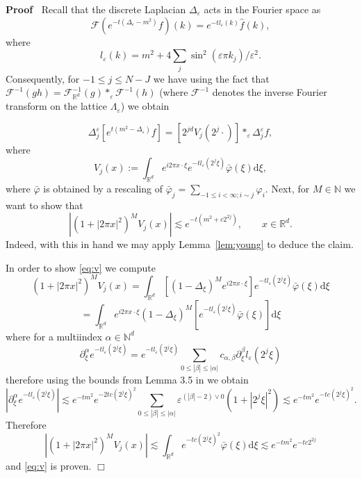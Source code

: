 \documentclass[a4paper,11pt]{article}
\newcommand{\assign}{:=}
\newcommand{\cdummy}{\cdot}
\newcommand{\mathd}{\mathrm{d}}
\newenvironment{proof}{\noindent\textbf{Proof\ }}{\hspace*{\fill}$\Box$\medskip}
\numberwithin{equation}{section}
\begin{document}
\begin{proof}
  Recall that the discrete Laplacian $\Delta_{\varepsilon}$ acts in the
  Fourier space as
  \[ \mathcal{F} (e^{- t (\Delta_{\varepsilon} - m^2)} f) (k) = e^{- t
     l_{\varepsilon} (k)} \hat{f} (k), \]
  where
  \[ l_{\varepsilon} (k) = m^2 + 4 \sum_{j}\sin^2 (\varepsilon \pi k_{j}) /
     \varepsilon^2 . \]
  Consequently, for $- 1 \leqslant j \leqslant N - J$ we have using the fact
  that $\mathcal{F}^{- 1} (g h) =\mathcal{F}_{\mathbb{R}^d}^{- 1} (g)
  \ast_{\varepsilon} \mathcal{F}^{- 1} (h)$ (where $\mathcal{F}^{- 1}$ denotes
  the inverse Fourier transform on the lattice $\Lambda_{\varepsilon}$) we
  obtain
  
  
  \[ \Delta^{\varepsilon}_j [e^{t (m^2 - \Delta_{\varepsilon})} f] = [2^{j d}
     V_j (2^j \cdummy)] \ast_{\varepsilon} \Delta^{\varepsilon}_j f, \]
  where
  \[ V_j (x) \assign \int_{\mathbb{R}^d} e^{i 2 \pi x \cdummy \xi} e^{- t
     l_{\varepsilon} (2^j \xi)} \bar{\varphi} (\xi) \mathd \xi, \]
  where $\bar{\varphi}$ is obtained by a rescaling of $\bar{\varphi}_j =
  \sum_{- 1 \leqslant i < \infty ; i \sim j} \varphi_i$. Next, for $M \in
  \mathbb{N}$ we want to show that
  \begin{equation}
    | (1 + | 2 \pi x |^2)^M V_j (x) | \lesssim e^{- t (m^2 + c 2^{2 j})},
    \qquad x \in \mathbb{R}^d . \label{eq:v}
  \end{equation}
  Indeed, with this in hand we may apply Lemma~\ref{lem:young} to deduce the
  claim.
  
  In order to show {\eqref{eq:v}} we compute
  \[ (1 + | 2 \pi x |^2)^M V_j (x) = \int_{\mathbb{R}^d} [(1 - \Delta_{\xi})^M
     e^{i 2 \pi x \cdummy \xi}] e^{- t l_{\varepsilon} (2^j \xi)}
     \bar{\varphi} (\xi) \mathd \xi \]
  \[ = \int_{\mathbb{R}^d} e^{i 2 \pi x \cdummy \xi} (1 - \Delta_{\xi})^M
     [e^{- t l_{\varepsilon} (2^j \xi)} \bar{\varphi} (\xi)] \mathd \xi \]
  where for a multiindex $\alpha \in \mathbb{N}^d$
  \[ \partial_{\xi}^{\alpha} e^{- t l_{\varepsilon} (2^j \xi)} = e^{- t
     l_{\varepsilon} (2^j \xi)} \sum_{0 \leqslant | \beta | \leqslant | \alpha
     |} c_{\alpha, \beta} \partial_{\xi}^{\beta} l_{\varepsilon} (2^j \xi) \]
  therefore using the bounds from Lemma 3.5 in {\cite{MP17}} we obtain
  \[ | \partial_{\xi}^{\alpha} e^{- t l_{\varepsilon} (2^j \xi)} | \lesssim
     e^{- t m^2} e^{- 2 t c (2^j \xi)^2} \sum_{0 \leqslant | \beta | \leqslant
     | \alpha |} \varepsilon^{(| \beta | - 2) \vee 0} (1 + | 2^j \xi |^2)
     \lesssim e^{- t m^2} e^{- t c (2^j \xi)^2} . \]
  Therefore
  \[ | (1 + | 2 \pi x |^2)^M V_j (x) | \lesssim \int_{\mathbb{R}^d} e^{- t c
     (2^j \xi)^2} \bar{\varphi} (\xi) \mathd \xi \lesssim e^{- t m^2} e^{- t c
     2^{2 j}} \]
  and {\eqref{eq:v}} is proven.
\end{proof}
\end{document}
